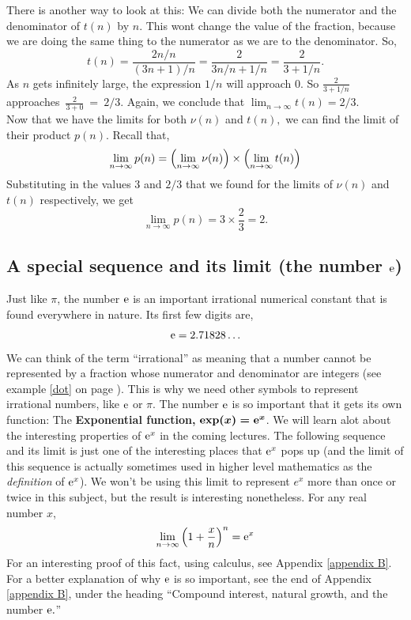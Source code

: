 There is another way to look at this: We can divide both the numerator and the denominator of $t(n)$ by $n$. This wont change the value of the fraction, because we are doing the same thing to the numerator as we are to the denominator. So,
\[
t(n) = \frac{2n/n}{(3n+1)/n} = \frac{2}{3n/n + 1/n} = \frac{2}{3 + 1/n}.
\]
As $n$ gets infinitely large, the expression $1/n$ will approach 0. So $\frac{2}{3+1/n}$ approaches~$\frac{2}{3 + 0}~=~2/3$. Again, we conclude that $\displaystyle{\lim_{n \rightarrow \infty}t(n) = 2/3.}$ \\

\noindent Now that we have the limits for both $\nu(n)$ and $t(n),$ we can find the limit of their product $p(n)$. Recall that,
\[
\lim_{n \rightarrow \infty}p(n) = \left(\lim_{n \rightarrow \infty}\nu(n)\right)\times\left(\lim_{n \rightarrow \infty}t(n)\right)
\]
Substituting in the values $3$ and $2/3$ that we found for the limits of $\nu(n)$ and $t(n)$ respectively, we get
\[
\lim_{n \rightarrow \infty}p(n) = 3 \times \frac{2}{3} = 2.
\]

\subsection{A special sequence and its limit (the number $\mathrm{e}$)} \label{sec4012}
Just like $\pi$, the number $\mathrm{e}$ is an important irrational numerical constant that is found everywhere in nature. Its first few digits are,
\[
\mathrm{e} = 2.71828\ldots
\]
We can think of the term ``irrational'' as meaning that a number cannot be represented by a fraction whose numerator and denominator are integers (see example \ref{dot} on page \pageref{dot}). This is why we need other symbols to represent irrational numbers, like $\mathrm{e}$ or $\pi$. The number $\mathrm{e}$ is so important that it gets its own function: The \textbf{Exponential function,} $\boldsymbol{\textbf{exp}(x) = \mathrm{e}^x}$. We will learn alot about the interesting properties of $\mathrm{e}^x$ in the coming lectures. The following sequence and its limit is just one of the interesting places that $\mathrm{e}^x$ pops up (and the limit of this sequence is actually sometimes used in higher level mathematics as the \textit{definition} of $\mathrm{e}^x$). We won't be using this limit to represent $e^x$ more than once or twice in this subject, but the result is interesting nonetheless. For any real number $x$, \label{ex} \label{exponential function}
\[
\lim_{n \rightarrow \infty}\left(1 + \frac{x}{n}\right)^n = \mathrm{e}^x
\]
For an interesting proof of this fact, using calculus, see Appendix \ref{appendix B}. For a better explanation of why $\mathrm{e}$ is so important, see the end of Appendix \ref{appendix B}, under the heading ``Compound interest, natural growth, and the number $\mathrm{e}.$''
